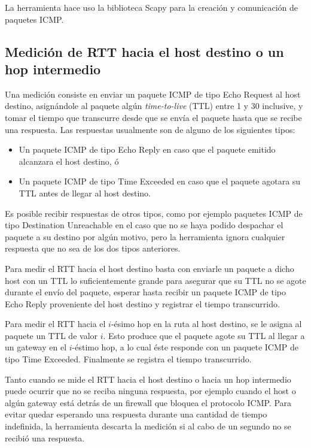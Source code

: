 \documentclass[a4paper, 10pt, twoside]{article}
\begin{document}
La herramienta hace uso la biblioteca Scapy \cite{scapy} para la creación y comunicación de paquetes ICMP.


\subsection{Medición de RTT hacia el host destino o un hop intermedio}

Una medición consiste en enviar un paquete ICMP de tipo Echo Request al host destino, asignándole al paquete algún \emph{time-to-live} (TTL) entre 1 y 30 inclusive, y tomar el tiempo que transcurre desde que se envía el paquete hasta que se recibe una respuesta. Las respuestas usualmente son de alguno de los siguientes tipos:

\begin{itemize}
  \item Un paquete ICMP de tipo Echo Reply en caso que el paquete emitido alcanzara el host destino, ó
  \item Un paquete ICMP de tipo Time Exceeded en caso que el paquete agotara su TTL antes de llegar al host destino.
\end{itemize}

Es posible recibir respuestas de otros tipos, como por ejemplo paquetes ICMP de tipo Destination Unreachable en el caso que no se haya podido despachar el paquete a su destino por algún motivo, pero la herramienta ignora cualquier respuesta que no sea de los dos tipos anteriores.

Para medir el RTT hacia el host destino basta con enviarle un paquete a dicho host con un TTL lo suficientemente grande para asegurar que su TTL no se agote durante el envío del paquete, esperar hasta recibir un paquete ICMP de tipo Echo Reply proveniente del host destino y registrar el tiempo transcurrido.

Para medir el RTT hacia el $i$-ésimo hop en la ruta al host destino, se le asigna al paquete un TTL de valor $i$. Esto produce que el paquete agote su TTL al llegar a un gateway en el $i$-éstimo hop, a lo cual éste responde con un paquete ICMP de tipo Time Exceeded. Finalmente se registra el tiempo transcurrido.

Tanto cuando se mide el RTT hacia el host destino o hacia un hop intermedio puede ocurrir que no se reciba ninguna respuesta, por ejemplo cuando el host o algún gateway está detrás de un firewall que bloquea el protocolo ICMP. Para evitar quedar esperando una respuesta durante una cantidad de tiempo indefinida, la herramienta descarta la medición si al cabo de un segundo no se recibió una respuesta.
\end{document}
